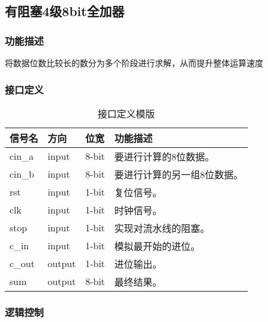 \subsection{有阻塞4级8bit全加器}\label{sub:ctl}
\subsubsection{功能描述}
将数据位数比较长的数分为多个阶段进行求解，从而提升整体运算速度
\subsubsection{接口定义}
\begin{table}[htp]
	\caption{接口定义模版}\label{tab:signaldef2}
	\begin{center}
		\begin{tabular}{|l|l|l|p{6cm}|}
		\hline
		\textbf{信号名} & \textbf{方向} & \textbf{位宽} & \textbf{功能描述}\\ \hline \hline
		cin\_a	& input	& 8-bit	& 要进行计算的8位数据。\\ \hline
		cin\_b	& input	& 8-bit	& 要进行计算的另一组8位数据。\\ \hline
		rst		& input	& 1-bit	& 复位信号。\\ \hline
		clk		& input	& 1-bit	& 时钟信号。\\ \hline
		stop	& input	& 1-bit	& 实现对流水线的阻塞。\\ \hline
		c\_in	& input	& 1-bit	& 模拟最开始的进位。\\ \hline
		c\_out	& output	& 1-bit	& 进位输出。\\ \hline
		sum		& output	& 8-bit	& 最终结果。\\ \hline
		\end{tabular}
	\end{center}
\end{table}
	
\subsubsection{逻辑控制}
